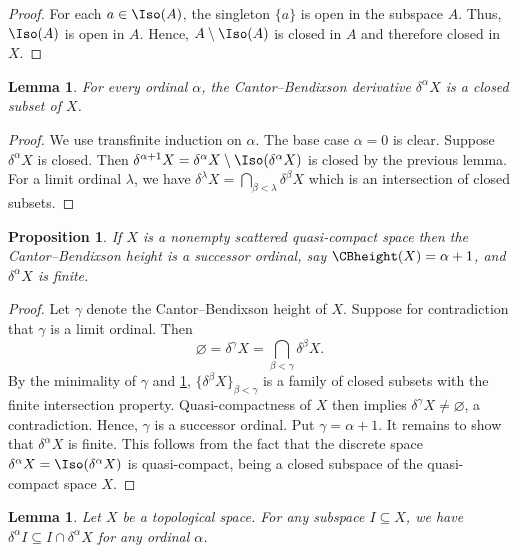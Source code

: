 \documentclass{amsart}
\numberwithin{equation}{section}%
\newtheorem{Prop}[equation]{Proposition}
\newtheorem{Lem}[equation]{Lemma}
\theoremstyle{remark}
\renewcommand{\emptyset}{\varnothing}
\begin{document}
\begin{proof}
	For each $a\in \Iso(A)$, the singleton $\{a\}$ is open in the subspace $A$. Thus, $\Iso(A)$ is open in $A$. Hence, $A \setminus \Iso(A)$ is closed in $A$ and therefore closed in $X$.
\end{proof}

\begin{Lem}\label{lem:delta-closed}
	For every ordinal $\alpha$, the Cantor--Bendixson derivative $\delta^\alpha X$ is a closed subset of $X$.
\end{Lem}

\begin{proof}
	We use transfinite induction on $\alpha$. The base case $\alpha=0$ is clear. Suppose $\delta^\alpha X$ is closed. Then $\delta^{\alpha+1} X=\delta^\alpha X\setminus\Iso(\delta^\alpha X)$ is closed by the previous lemma. For a limit ordinal $\lambda$, we have $\delta^\lambda X= \bigcap_{\beta < \lambda} \delta^\beta X$ which is an intersection of closed subsets.
\end{proof}

\begin{Prop}\label{prop:CB-successor}
	If $X$ is a nonempty scattered  quasi-compact space then the Cantor--Bendixson height is a successor ordinal, say $\CBheight(X)=\alpha+1$, and $\delta^\alpha X$ is finite.
\end{Prop}

\begin{proof}
 	Let $\gamma$ denote the Cantor--Bendixson height of $X$. Suppose for contradiction that $\gamma$ is a limit ordinal. Then
    \[
		\emptyset=\delta^\gamma X= \bigcap_{\beta<\gamma}\delta^\beta X.
    \]
	By the minimality of $\gamma$ and \cref{lem:delta-closed}, $\{\delta^\beta X\}_{\beta<\gamma}$ is a family of closed subsets with the finite intersection property. Quasi-compactness of $X$ then implies $\delta^\gamma X\neq\emptyset$, a contradiction. Hence, $\gamma$ is a successor ordinal. Put $\gamma=\alpha+1$. It remains to show that $\delta^\alpha X$ is finite. This follows from the fact that the discrete space $\delta^\alpha X=\Iso(\delta^\alpha X)$ is quasi-compact, being a closed subspace of the quasi-compact space $X$.
\end{proof}

\begin{Lem}\label{lem:delta-I}
	Let $X$ be a topological space. For any subspace $I \subseteq X$, we have $\delta^\alpha I \subseteq I \cap \delta^\alpha X$ for any ordinal $\alpha$.
\end{Lem}
\end{document}
